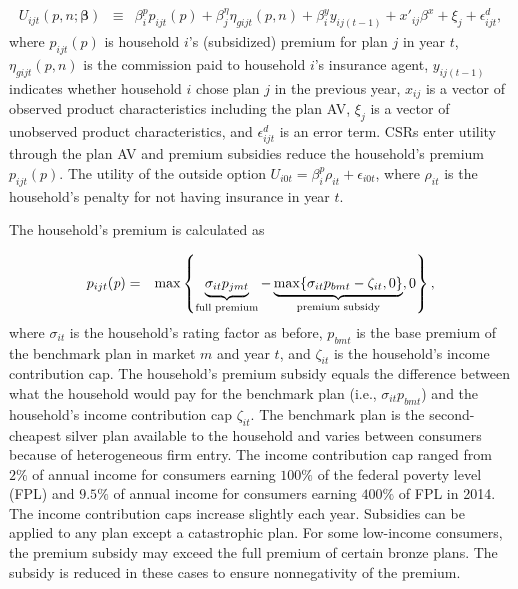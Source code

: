 \documentclass[12pt]{article}
\begin{document}
\vspace{-0.4in}
\begin{eqnarray}
\label{eqn:demand_model}
	U_{ijt}(\textit{p},\textit{n};\boldsymbol{\beta}) &\equiv& \beta_{i}^p p_{ijt}(\textit{p}) + \beta_j^{\eta} \eta_{gijt}(\textit{p},\textit{n})   + \beta_i^y y_{ij(t-1)} + x'_{ij}\beta^x + \xi_{j} + \epsilon_{ijt}^d, 
\end{eqnarray}
where $p_{ijt}(\textit{p})$ is household $i$'s (subsidized) premium for plan $j$ in year $t$, $\eta_{gijt}(\textit{p},\textit{n})$ is the commission paid to household $i$'s insurance agent, $y_{ij(t-1)}$ indicates whether household $i$ chose plan $j$ in the previous year, $x_{ij}$ is a vector of observed product characteristics including the plan AV,  $\xi_{j}$ is a vector of unobserved product characteristics, and $\epsilon_{ijt}^d$ is an error term.  CSRs enter utility through the plan AV and premium subsidies reduce the household's premium $p_{ijt}(\textit{p})$.   The utility of the outside option $U_{i0t} = \beta_i^p \rho_{it} + \epsilon_{i0t}$, where $\rho_{it}$ is the household's penalty for not having insurance in year $t$. 

The household's premium is calculated as

\vspace{-0.4in}
\begin{eqnarray}
\label{eqn:cons_premium}
	p_{ijt}(\textit{p}) &=& \max \left \lbrace \underbrace{\sigma_{it} p_{jmt}}_{\text{\scriptsize{full premium}}}  - \underbrace{\max\{\sigma_{it} p_{bmt} - \zeta_{it},0\}}_{\text{\scriptsize{premium subsidy}}},0 \right \rbrace, 
\end{eqnarray}
where $\sigma_{it}$ is the household's rating factor as before, $p_{bmt}$ is the base premium of the benchmark plan in market $m$ and year $t$, and $\zeta_{it}$ is the household's income contribution cap.  The household's premium subsidy equals the difference between what the household would pay for the benchmark plan (i.e., $\sigma_{it} p_{bmt}$) and the household's income contribution cap $\zeta_{it}$. The benchmark plan is the second-cheapest silver plan available to the household and varies between consumers because of heterogeneous firm entry. The income contribution cap ranged from $2\%$ of annual income for consumers earning $100\%$ of the federal poverty level (FPL) and $9.5\%$ of annual income for consumers earning $400\%$ of FPL in 2014. The income contribution caps increase slightly each year. Subsidies can be applied to any plan except a catastrophic plan. For some low-income consumers, the premium subsidy may exceed the full premium of certain bronze plans. The subsidy is reduced in these cases to ensure nonnegativity of the premium. 
\end{document}
